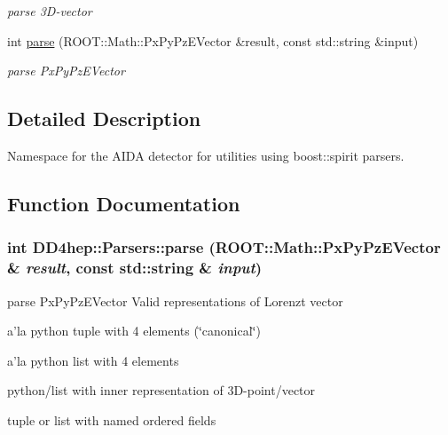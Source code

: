 \begin{DoxyCompactItemize}
\begin{DoxyCompactList}\small\item\em parse 3D-\/vector \item\end{DoxyCompactList}\item 
int \hyperlink{namespace_d_d4hep_1_1_parsers_aa49d5f1a00fb97ffdcac92a067fc14a2}{parse} (ROOT::Math::PxPyPzEVector \&result, const std::string \&input)
\begin{DoxyCompactList}\small\item\em parse PxPyPzEVector \item\end{DoxyCompactList}\end{DoxyCompactItemize}


\subsection{Detailed Description}
Namespace for the AIDA detector for utilities using boost::spirit parsers. 

\subsection{Function Documentation}
\hypertarget{namespace_d_d4hep_1_1_parsers_aa49d5f1a00fb97ffdcac92a067fc14a2}{
\subsubsection[{parse}]{\setlength{\rightskip}{0pt plus 5cm}int DD4hep::Parsers::parse (ROOT::Math::PxPyPzEVector \& {\em result}, \/  const std::string \& {\em input})}}
\label{namespace_d_d4hep_1_1_parsers_aa49d5f1a00fb97ffdcac92a067fc14a2}


parse PxPyPzEVector Valid representations of Lorenzt vector


\begin{DoxyItemize}
\item a'la python tuple with 4 elements (\char`\"{}canonical\char`\"{})
\item a'la python list with 4 elements
\item python/list with inner representation of 3D-\/point/vector
\item tuple or list with named ordered fields
\end{DoxyItemize}


